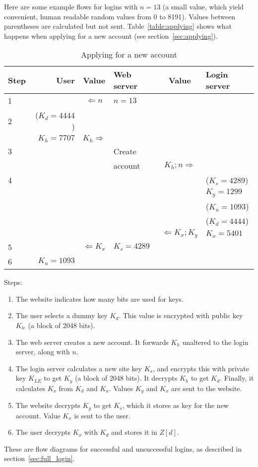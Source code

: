 \label{sec:schemes}
Here are some example flows for logins with $n=13$
(a small value, which yield convenient, human readable random values from 0 to 8191).
Values between parentheses are calculated but not sent.
\label{scheme:new_account}
Table~\vref{table:applying} shows what happens when applying for a new account
(see section~\vref{sec:applying}).
\begin{table}[hb]
\label{table:applying}
\caption{Applying for a new account}
\begin{tabular}{|l|r|c|l|c|l|}
\hline
Step & User & Value & Web server & Value & Login server\\
\hline
1 & & $\Longleftarrow n$ & $n=13$ & & \\
\hline
2 & ($K_d=4444$) & & & & \\
  & $K_h=7707$ & $K_h \Longrightarrow$ & & & \\
\hline
3 & & & Create  & & \\
  & & & account & $K_h;n \Longrightarrow$ & \\
\hline
4 & & & & & ($K_s=4289$) \\
  & & & & & $K_y=1299$ \\
  & & & & & ($K_u=1093$) \\
  & & & & & ($K_d=4444$) \\
  & & & & $\Longleftarrow K_x;K_y$ & $K_x=5401$ \\
\hline
5 & & $\Longleftarrow K_x$ & $K_s=4289$ & & \\
\hline
6 & $K_u=1093$ & & & & \\
\hline
\end{tabular}
\end{table}
\par
Steps:
\begin{enumerate}
\item	The website indicates how many bits are used for keys.
\item	The user selects a dummy key $K_d$.
		This value is encrypted with public key $K_{le}$
		(a block of 2048 bits).
\item	The web server creates a new account.
		It forwards $K_h$ unaltered to the login server,
		along with $n$.
\item	The login server calculates a new site key $K_s$,
		and encrypts this with private key $K_{LE}$ to get $K_y$
		(a block of 2048 bits).
		It decrypts $K_h$ to get $K_d$.
		Finally, it calculates $K_x$ from $K_d$ and $K_u$.
		Values $K_y$ and $K_x$ are sent to the website.
\item	The website decrypts $K_y$ to get $K_s$,
		which it stores as key for the new account.
		Value $K_x$ is sent to the user.
\item	The user decrypts $K_x$ with $K_d$ and stores it in $Z[d]$.
\end{enumerate}
These are flow diagrams for successful and unsuccessful logins,
as described in section~\vref{sec:full_login}.
